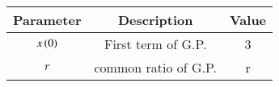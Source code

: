 \begin{tabular}{|c|c|c|}
    \hline
    \textbf{Parameter} & \textbf{Description} & \textbf{Value} \\
    \hline
    $x\left(0\right)$ & First term of G.P. & 3 \\
    \hline
    $r$ & common ratio of G.P. & r \\
    \hline
\end{tabular}

